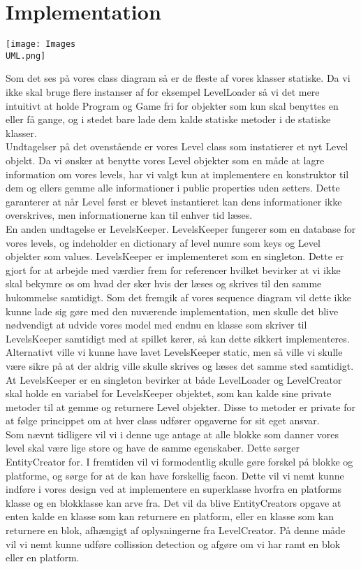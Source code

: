 \section{Implementation}
\texttt{[image: Images\\UML.png]}

Som det ses på vores class diagram så er de fleste af vores klasser statiske. Da vi ikke skal bruge flere instanser af for eksempel LevelLoader så vi det mere intuitivt at holde Program og Game fri for objekter som kun skal benyttes en eller få gange, og i stedet bare lade dem kalde statiske metoder i de statiske klasser.\\
Undtagelser på det ovenstående er vores Level class som instatierer et nyt Level objekt. Da vi ønsker at benytte vores Level objekter som en måde at lagre information om vores levels, har vi valgt kun at implementere en konstruktor til dem og ellers gemme alle informationer i public properties uden setters. Dette garanterer at når Level først er blevet instantieret kan dens informationer ikke overskrives, men informationerne kan til enhver tid læses.\\
En anden undtagelse er LevelsKeeper. LevelsKeeper fungerer som en database for vores levels, og indeholder en dictionary af level numre som keys og Level objekter som values. LevelsKeeper er implementeret som en singleton. Dette er gjort for at arbejde med værdier frem for referencer hvilket bevirker at vi ikke skal bekymre os om hvad der sker hvis der læses og skrives til den samme hukommelse samtidigt. Som det fremgik af vores sequence diagram vil dette ikke kunne lade sig gøre med den nuværende implementation, men skulle det blive nødvendigt at udvide vores model med endnu en klasse som skriver til LevelsKeeper samtidigt med at spillet kører, så kan dette sikkert implementeres. Alternativt ville vi kunne have lavet LevelsKeeper static, men så ville vi skulle være sikre på at der aldrig ville skulle skrives og læses det samme sted samtidigt.\\
At LevelsKeeper er en singleton bevirker at både LevelLoader og LevelCreator skal holde en variabel for LevelsKeeper objektet, som kan kalde sine private metoder til at gemme og returnere Level objekter. Disse to metoder er private for at følge princippet om at hver class udfører opgaverne for sit eget ansvar.\\

Som nævnt tidligere vil vi i denne uge antage at alle blokke som danner vores level skal være lige store og have de samme egenskaber. Dette sørger EntityCreator for. I fremtiden vil vi formodentlig skulle gøre forskel på blokke og platforme, og sørge for at de kan have forskellig facon. Dette vil vi nemt kunne indføre i vores design ved at implementere en superklasse hvorfra en platforms klasse og en blokklasse kan arve fra. Det vil da blive EntityCreators opgave at enten kalde en klasse som kan returnere en platform, eller en klasse som kan returnere en blok, afhængigt af oplysningerne fra LevelCreator. På denne måde vil vi nemt kunne udføre collission detection og afgøre om vi har ramt en blok eller en platform. 
